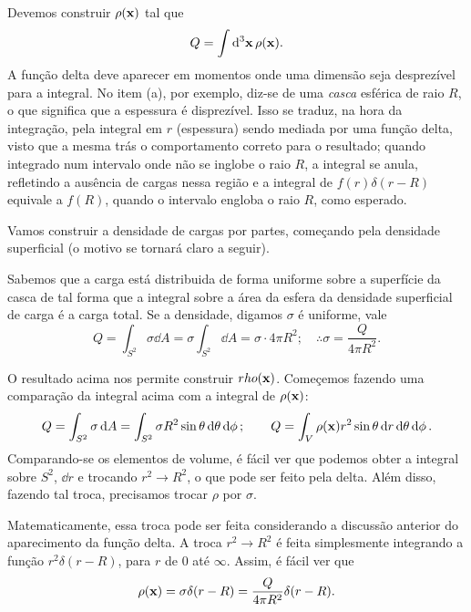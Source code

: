 \newpage
{}


Devemos construir $\rho(\vb{x})$ tal que
\[
  Q = \int \dd[3]{\vb{x}} \rho(\vb{x}).
\]
A função delta deve aparecer em momentos onde uma dimensão seja desprezível para a integral. No item (a), por exemplo, diz-se de uma \textit{casca} esférica de raio $R$, o que significa que a espessura é disprezível. Isso se traduz, na hora da integração, pela integral em $r$ (espessura) sendo mediada por uma função delta, visto que a mesma trás o comportamento correto para o resultado; quando integrado num intervalo onde não se inglobe o raio $R$, a integral se anula, refletindo a ausência de cargas nessa região e a integral de $f(r) \delta(r - R)$ equivale a $f(R)$, quando o intervalo engloba o raio $R$, como esperado.

Vamos construir a densidade de cargas por partes, começando pela densidade superficial (o motivo se tornará claro a seguir).

Sabemos que a carga está distribuida de forma uniforme sobre a superfície da casca de tal forma que a integral sobre a área da esfera da densidade superficial de carga é a carga total. Se a densidade, digamos $\sigma$ é uniforme, vale
\[
  Q = \int_{S^2} \sigma \dd{A} = \sigma \int_{S^2} \dd{A} = \sigma \cdot 4\pi R^2;
  \quad
  \therefore \sigma = \frac{Q}{4\pi R^2}.
\]

O resultado acima nos permite construir $rho(\vb{x})$. Começemos fazendo uma comparação da integral acima com a integral de $\rho(\vb{x})$:
\begin{equation*}
  Q = \int_{S^2} \sigma \dd{A} = \int_{S^2} \sigma R^2 \sin \theta \dd{\theta} \dd{\phi};
  \qquad
  Q = \int_V \rho(\vb{x}) r^2 \sin \theta \dd{r} \dd{\theta} \dd{\phi}.
\end{equation*}
Comparando-se os elementos de volume, é fácil ver que podemos obter a integral sobre $S^2$,  $\dd{r}$ e trocando $r^2 \to R^2$, o que pode ser feito pela delta. Além disso, fazendo tal troca, precisamos trocar $\rho$ por $\sigma$.

Matematicamente, essa troca pode ser feita considerando a discussão anterior do aparecimento da função delta. A troca $r^2 \to R^2$ é feita simplesmente integrando a função $r^2 \delta(r - R)$, para $r$ de $0$ até $\infty$. Assim, é fácil ver que
\[
  \rho(\vb{x}) = \sigma \delta(r - R) = \frac{Q}{4\pi R^2} \delta(r - R).
\]



